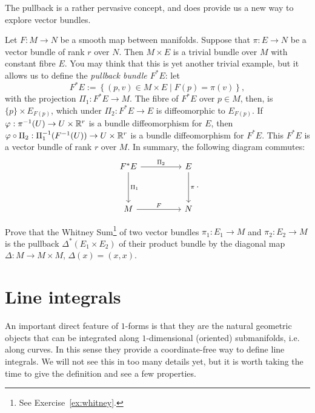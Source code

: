 The pullback is a rather pervasive concept, and does provide us a new way to explore vector bundles.

\begin{example}
	Let $F:M\to N$ be a smooth map between manifolds. Suppose that $\pi: E \to N$ be a vector bundle of rank $r$ over $N$.
	Then $M\times E$ is a trivial bundle over $M$ with constant fibre $E$.
	You may think that this is yet another trivial example, but it allows us to define the \emph{pullback bundle $F^* E$}: let
	\begin{equation}
		F^* E := \left\lbrace (p, v) \in M\times E \mid F(p) = \pi(v)\right\rbrace,
	\end{equation}
	with the projection $\Pi_1:F^* E \to M$.
	The fibre of $F^*E$ over $p\in M$, then, is $\{p\}\times E_{F(p)}$, which under $\Pi_2:F^* E \to E$ is diffeomorphic to $E_{F(p)}$.
	If $\varphi : \pi^{-1}(U) \to U\times\mathbb{R}^r$ is a bundle diffeomorphism for $E$, then $\varphi\circ\Pi_2: \Pi_1^{-1}(F^{-1}(U)) \to U\times\mathbb{R}^r$ is a bundle diffeomorphism for $F^*E$.
	This $F^*E$ is a vector bundle of rank $r$ over $M$.
	In summary, the following diagram commutes:
	\begin{equation}
		\begin{tikzcd}[row sep=huge, column sep=huge]
			F^* E \arrow[r, "\Pi_2"] \arrow[d, "\Pi_1"]
			& E \arrow[d, "\pi"] \\
			M \arrow[r, "F"]
			& N
		\end{tikzcd}.
	\end{equation}
\end{example}

\begin{exercise}
	Prove that the Whitney Sum\footnote{See Exercise~\ref{ex:whitney}.}
	of two vector bundles $\pi_1 : E_1 \to M$ and $\pi_2 : E_2 \to M$
	is the pullback $\Delta^*(E_1 \times E_2)$ of their product bundle by the diagonal map
	$\Delta : M \to M \times M$, $\Delta(x) = (x, x)$.
\end{exercise}

\section{Line integrals}

An important direct feature of $1$-forms is that they are the natural geometric objects that can be integrated along $1$-dimensional (oriented) submanifolds, i.e. along curves.
In this sense they provide a coordinate-free way to define line integrals.
We will not see this in too many details yet, but it is worth taking the time to give the definition and see a few properties.

